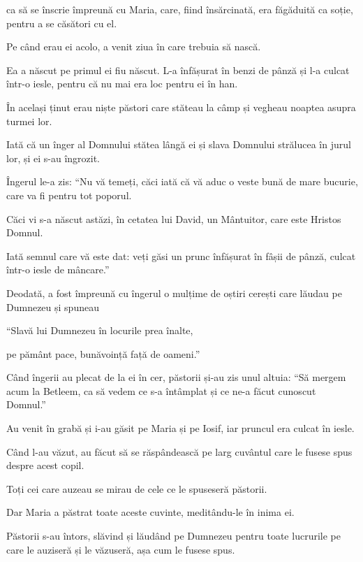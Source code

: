 {ca să se înscrie împreună cu Maria, care, fiind însărcinată, era făgăduită ca soție, pentru a se căsători cu el.


\par }{\PP {}Pe când erau ei acolo, a venit ziua în care trebuia să nască.

Ea a născut pe primul ei fiu născut. L-a înfășurat în benzi de pânză și l-a culcat într-o iesle, pentru că nu mai era loc pentru ei în han.


\par }{\PP {}În același ținut erau niște păstori care stăteau la câmp și vegheau noaptea asupra turmei lor.

Iată că un înger al Domnului stătea lângă ei și slava Domnului strălucea în jurul lor, și ei s-au îngrozit.

Îngerul le-a zis: “Nu vă temeți, căci iată că vă aduc o veste bună de mare bucurie, care va fi pentru tot poporul.

Căci vi s-a născut astăzi, în cetatea lui David, un Mântuitor, care este Hristos Domnul.

Iată semnul care vă este dat: veți găsi un prunc înfășurat în fâșii de pânză, culcat într-o iesle de mâncare.”

Deodată, a fost împreună cu îngerul o mulțime de oștiri cerești care lăudau pe Dumnezeu și spuneau


\par }{\Q {}“Slavă lui Dumnezeu în locurile prea înalte,

\par }{\QB pe pământ pace, bunăvoință față de oameni.”


\par }{\PP {}Când îngerii au plecat de la ei în cer, păstorii și-au zis unul altuia: “Să mergem acum la Betleem, ca să vedem ce s-a întâmplat și ce ne-a făcut cunoscut Domnul.”

Au venit în grabă și i-au găsit pe Maria și pe Iosif, iar pruncul era culcat în iesle.

Când l-au văzut, au făcut să se răspândească pe larg cuvântul care le fusese spus despre acest copil.

Toți cei care auzeau se mirau de cele ce le spuseseră păstorii.

Dar Maria a păstrat toate aceste cuvinte, meditându-le în inima ei.

Păstorii s-au întors, slăvind și lăudând pe Dumnezeu pentru toate lucrurile pe care le auziseră și le văzuseră, așa cum le fusese spus.


}
